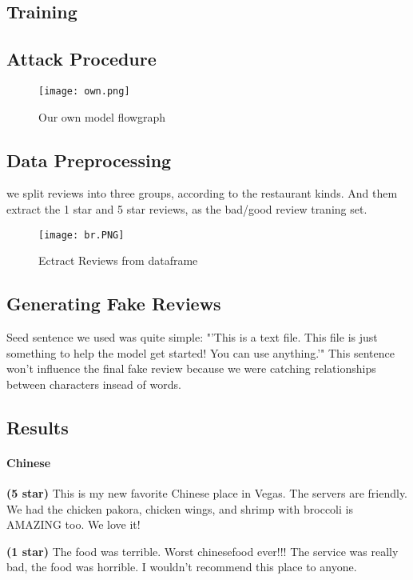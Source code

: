 \documentclass[conference]{IEEEtran}
\begin{document}
\subsection{Training}



\subsection{Attack Procedure}
\begin{figure}[htbp]
\centerline{\texttt{[image: own.png]}}
\caption{Our own model flowgraph}
\label{fig}
\end{figure}


\subsection{Data Preprocessing}
\par we split reviews into three groups, according to the restaurant kinds. And them extract the 1 star and 5 star reviews, as the bad/good review traning set.
\begin{figure}[htbp]
\centerline{\texttt{[image: br.PNG]}}
\caption{Ectract Reviews from dataframe}
\label{fig}
\end{figure}
\subsection{Generating Fake Reviews}
\par Seed sentence we used was quite simple: "'This is a text file.  This file is just something to help the model get started!  You can use anything.'" This sentence won't influence the final fake review because we were catching relationships between characters insead of words.

\subsection{Results}
\paragraph{Chinese}
\par \textbf{(5 star)} This is my new favorite Chinese place in Vegas. The servers are friendly. We had the chicken pakora, chicken wings, and shrimp with broccoli is AMAZING too. We love it!
\par\textbf{(1 star)} The food was terrible. Worst chinesefood ever!!! The service was really bad, the food was horrible. I wouldn't recommend this place to anyone.
\end{document}
